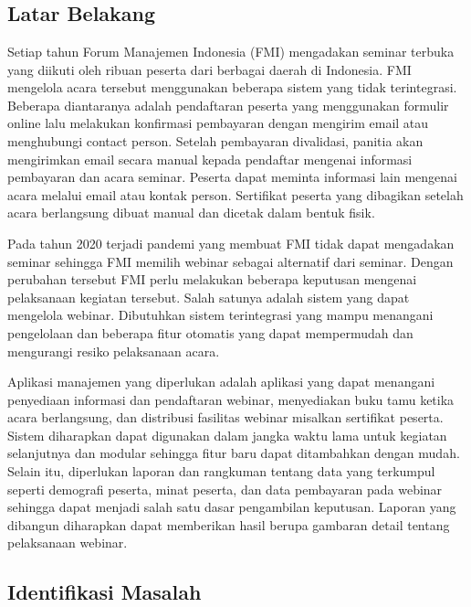 \chapter{\babSatu}

\section{Latar Belakang}

Setiap tahun Forum Manajemen Indonesia (FMI) mengadakan seminar terbuka yang
diikuti oleh ribuan peserta dari berbagai daerah di Indonesia. FMI mengelola
acara tersebut menggunakan beberapa sistem yang tidak terintegrasi. Beberapa
diantaranya adalah pendaftaran peserta yang menggunakan formulir online lalu
melakukan konfirmasi pembayaran dengan mengirim email atau menghubungi contact
person. Setelah pembayaran divalidasi, panitia akan mengirimkan email secara
manual kepada pendaftar mengenai informasi pembayaran dan acara seminar.
Peserta dapat meminta informasi lain mengenai acara melalui email atau kontak
person. Sertifikat peserta yang dibagikan setelah acara berlangsung dibuat
manual dan dicetak dalam bentuk fisik.

Pada tahun 2020 terjadi pandemi yang membuat FMI tidak dapat mengadakan seminar
sehingga FMI memilih webinar sebagai alternatif dari seminar. Dengan perubahan
tersebut FMI perlu melakukan beberapa keputusan mengenai pelaksanaan kegiatan
tersebut. Salah satunya adalah sistem yang dapat mengelola webinar. Dibutuhkan
sistem terintegrasi yang mampu menangani pengelolaan dan beberapa fitur
otomatis yang dapat mempermudah dan mengurangi resiko pelaksanaan acara.

Aplikasi manajemen yang diperlukan adalah aplikasi yang dapat menangani
penyediaan informasi dan pendaftaran webinar, menyediakan buku tamu ketika
acara berlangsung, dan distribusi fasilitas webinar misalkan sertifikat
peserta. Sistem diharapkan dapat digunakan dalam jangka waktu lama untuk
kegiatan selanjutnya dan modular sehingga fitur baru dapat ditambahkan dengan
mudah. Selain itu, diperlukan laporan dan rangkuman tentang data yang terkumpul
seperti demografi peserta, minat peserta, dan data pembayaran pada webinar
sehingga dapat menjadi salah satu dasar pengambilan keputusan. Laporan yang
dibangun diharapkan dapat memberikan hasil berupa gambaran detail tentang
pelaksanaan webinar.

\section{Identifikasi Masalah}


